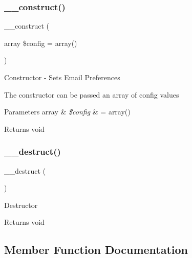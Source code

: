 \subsubsection{\texorpdfstring{\+\_\+\+\_\+construct()}{\_\_construct()}}
{\footnotesize\ttfamily \+\_\+\+\_\+construct (\begin{DoxyParamCaption}\item[{array}]{\$config = {\ttfamily array()} }\end{DoxyParamCaption})}

Constructor -\/ Sets Email Preferences

The constructor can be passed an array of config values


\begin{DoxyParams}[1]{Parameters}
array & {\em \$config} & = array() \\
\hline
\end{DoxyParams}
\begin{DoxyReturn}{Returns}
void 
\end{DoxyReturn}
\mbox{\label{class_c_i___email_a421831a265621325e1fdd19aace0c758}} 
\subsubsection{\texorpdfstring{\+\_\+\+\_\+destruct()}{\_\_destruct()}}
{\footnotesize\ttfamily \+\_\+\+\_\+destruct (\begin{DoxyParamCaption}{ }\end{DoxyParamCaption})}

Destructor

\begin{DoxyReturn}{Returns}
void 
\end{DoxyReturn}


\subsection{Member Function Documentation}
\mbox{\label{class_c_i___email_a24b79594abe7528b9207c3dad7494f70}} 
